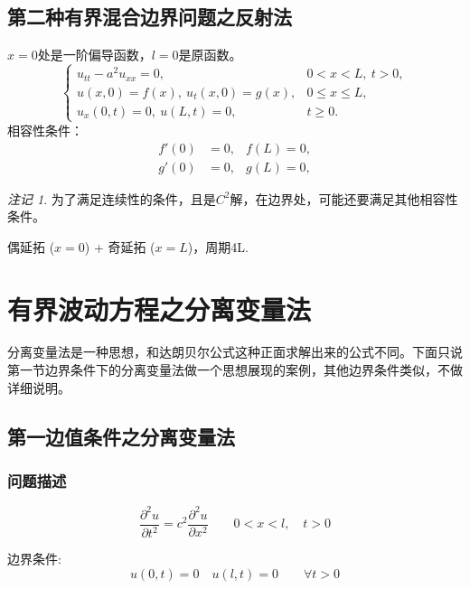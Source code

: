 \documentclass[12pt,a4paper]{article}
\numberwithin{subsection}{section}   %
\numberwithin{subsubsection}{subsection}
\theoremstyle{plain}
\theoremstyle{definition}
\theoremstyle{remark}
\newtheorem{remark}[theorem]{注记}
\theoremstyle{remark}
\begin{document}
\subsection{第二种有界混合边界问题之反射法}
	$x=0$处是一阶偏导函数，$ l=0$是原函数。
		\begin{equation}
		\begin{cases}
			u_{tt} - a^2 u_{xx} = 0, & 0 < x < L, \ t > 0, \\
			u(x, 0) = f(x), \ u_t(x, 0) = g(x), & 0 \leq x \leq L, \\
			u_x(0, t) = 0, \ u(L, t) = 0, & t \geq 0.
		\end{cases}
	\end{equation}
	相容性条件：
	\begin{equation}
		\begin{aligned}
			f'(0) & = 0, & f(L)  = 0, \\
			g'(0) & =0, & g(L)  = 0,
		\end{aligned}
	\end{equation}
	\begin{remark}
		为了满足连续性的条件，且是$C^2$解，在边界处，可能还要满足其他相容性条件。
	\end{remark}
	
	偶延拓 ($x=0$) + 奇延拓 ($x=L$)，周期4L.
	


	
	
	\section{有界波动方程之分离变量法}
	分离变量法是一种思想，和达朗贝尔公式这种正面求解出来的公式不同。下面只说第一节边界条件下的分离变量法做一个思想展现的案例，其他边界条件类似，不做详细说明。
	\subsection{第一边值条件之分离变量法}
	\subsubsection{问题描述}
	\begin{equation} \label{eq:wave_equation}
		\frac{\partial^2 u}{\partial t^2} = c^2 \frac{\partial^2 u}{\partial x^2} \qquad 0 < x < l, \quad t > 0
	\end{equation}
	
	边界条件:
	\begin{equation} \label{eq:boundary_conditions}
		u(0, t) = 0 \quad u(l, t) = 0 \qquad \forall t > 0
	\end{equation}
	
\end{document}
